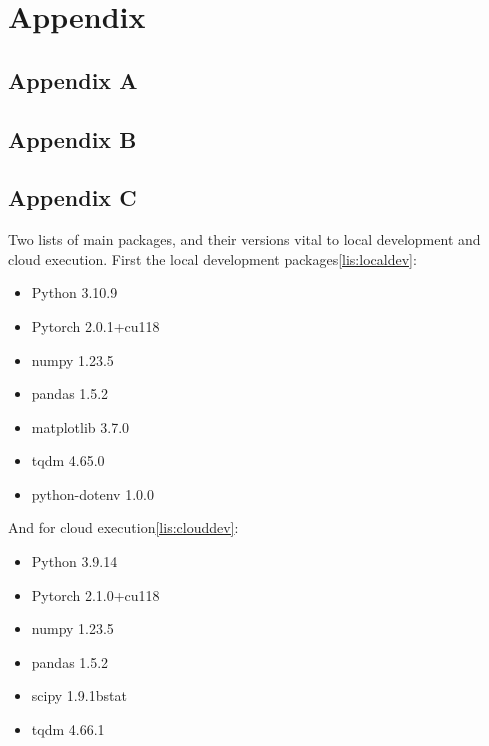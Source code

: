 \section{Appendix}\label{sec:appendix}

\subsection{Appendix A}\label{subsec:appendixA}


\subsection{Appendix B}\label{subsec:appendixB}


\subsection{Appendix C}\label{subsec:appendixC}

Two lists of main packages, and their versions vital to local development and cloud execution.
First the local development packages\ref{lis:localdev}:

\begin{itemize}\label{lis:localdev}
    \item Python 3.10.9
    \item Pytorch 2.0.1+cu118
    \item numpy 1.23.5
    \item pandas 1.5.2
    \item matplotlib 3.7.0
    \item tqdm 4.65.0
    \item python-dotenv 1.0.0
\end{itemize}

And for cloud execution\ref{lis:clouddev}:

\begin{itemize}\label{lis:clouddev}
    \item Python 3.9.14
    \item Pytorch 2.1.0+cu118
    \item numpy 1.23.5
    \item pandas 1.5.2
    \item scipy 1.9.1bstat
    \item tqdm 4.66.1
\end{itemize}